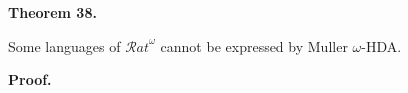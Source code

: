 \documentclass[10pt,a4paper]{article}
\begin{document}
 
 
\par\medskip\noindent\textbf{Theorem 38.}\par
 
 
Some languages of ${\mathcal{R}at}^{\omega}$ cannot be expressed by Muller $\omega$-HDA.\par
 
 
 
 
 
\par\medskip\noindent\textbf{Proof.}\par
 
 
\end{document}
